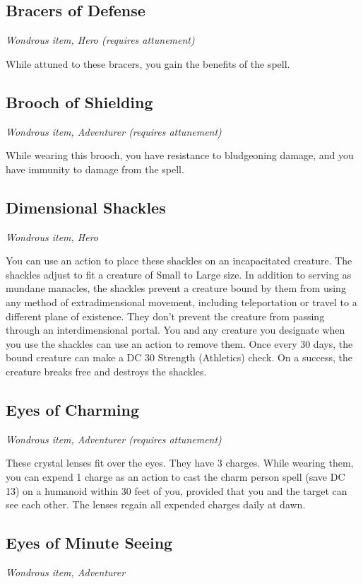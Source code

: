 \subsection{Bracers of Defense}
\textit{Wondrous item, Hero (requires attunement)}

While attuned to these bracers, you gain the benefits of the  spell.

\subsection{Brooch of Shielding}
\textit{Wondrous item, Adventurer (requires attunement)}

While wearing this brooch, you have resistance to bludgeoning damage, and you have immunity to damage from the  spell.

\subsection{Dimensional Shackles}
\textit{Wondrous item, Hero}

You can use an action to place these shackles on an incapacitated creature. The shackles adjust to fit a creature of Small to Large size. In addition to serving as mundane manacles, the shackles prevent a creature bound by them from using any method of extradimensional movement, including teleportation or travel to a different plane of existence. They don't prevent the creature from passing through an interdimensional portal. You and any creature you designate when you use the shackles can use an action to remove them. Once every 30 days, the bound creature can make a DC 30 Strength (Athletics) check. On a success, the creature breaks free and destroys the shackles.

\subsection{Eyes of Charming}
\textit{Wondrous item, Adventurer (requires attunement)}

These crystal lenses fit over the eyes. They have 3 charges. While wearing them, you can expend 1 charge as an action to cast the charm person spell (save DC 13) on a humanoid within 30 feet of you, provided that you and the target can see each other. The lenses regain all expended charges daily at dawn.

\subsection{Eyes of Minute Seeing}
\textit{Wondrous item, Adventurer}

